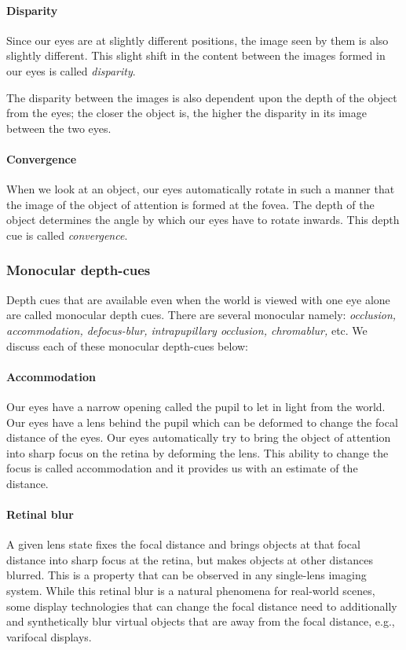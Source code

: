 \paragraph{Disparity} Since our eyes are at slightly different positions, the image seen by them is also slightly different. 
This slight shift in the content between the images formed in our eyes is called \emph{disparity}. 



The disparity between the images is also dependent upon the depth of the object from the eyes; the closer the object is, the higher the disparity in its image between the two eyes. 

\paragraph{Convergence} When we look at an object, our eyes automatically rotate in such a manner that the image of the object of attention is formed at the fovea. 
The depth of the object determines the angle by which our eyes have to rotate inwards. This depth cue is called \emph{convergence}.

\subsubsection{Monocular depth-cues}
\label{sec:background:monocular}
Depth cues that are available even when the world is viewed with one eye alone are called monocular depth cues. 
There are several monocular namely: \emph{occlusion, accommodation, defocus-blur, intrapupillary occlusion, chromablur,} etc. 
We discuss each of these monocular depth-cues below: 

\paragraph{Accommodation} Our eyes have a narrow opening called the pupil to let in light from the world. 
Our eyes have a lens behind the pupil which can be deformed to change the focal distance of the eyes. 
Our eyes automatically try to bring the object of attention into sharp focus on the retina by deforming the lens. 
This ability to change the focus is called accommodation and it provides us with an estimate of the distance. 

\paragraph{Retinal blur} A given lens state fixes the focal distance and brings objects at that focal distance into sharp focus at the retina, but makes objects at other distances blurred. 
This is a property that can be observed in any single-lens imaging system. 
While this retinal blur is a natural phenomena for real-world scenes, some display technologies that can change the focal distance need to additionally and synthetically blur virtual objects that are away from the focal distance, e.g., varifocal displays. 

